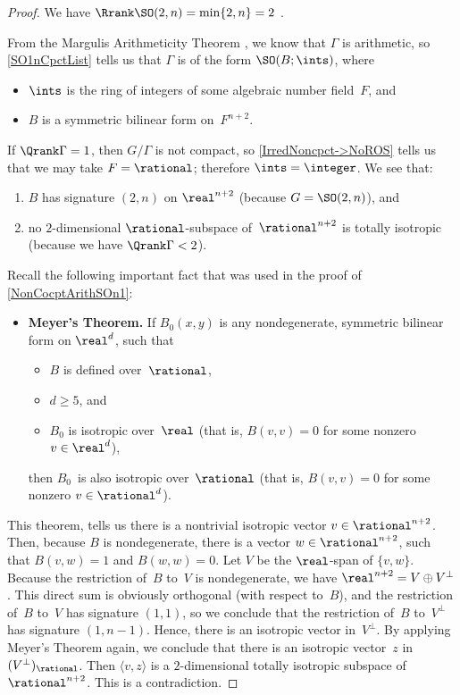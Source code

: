 \begin{proof}
 We have $\Rrank \SO(2,n) = \min\{2,n\} = 2$ .

From the Margulis Arithmeticity Theorem , we know that $\Gamma$ is
arithmetic, so \cref{SO1nCpctList} tells us that $\Gamma$ is of the form $\SO(B; \ints)$, where 
	\begin{itemize}
	\item $\ints$ is the ring of integers of some algebraic number field~$F$,
	and
	\item $B$ is a symmetric bilinear form on~$F^{n+2}$.
	\end{itemize}
If $\Qrank \Gamma = 1$, then $G/\Gamma$  is not compact, so \cref{IrredNoncpct->NoROS} tells us that we may take $F = \rational$; therefore $\ints = \integer$.
We see that:
	 \begin{enumerate}
	 \item $B$ has signature $(2,n)$ on $\real^{n+2}$ (because $G = \SO(2,n)$), 
	 and
	 \item no $2$-dimensional $\rational$-subspace of~$\rational^{n+2}$ is
	totally isotropic (because we have $\Qrank \Gamma < 2$).
	 \end{enumerate}
Recall the following important fact that was used in the proof of \cref{NonCocptArithSOn1}:
	 \begin{itemize} \renewcommand{\labelitemi}{}
	  \it
	 \item \label{Isot/R->Isot/Q}
	 {\bf Meyer's Theorem.}
	 If $B_0(x,y)$ is any nondegenerate, symmetric bilinear form
	on\/ $\real^d$, such that
	 \begin{itemize}
	 \item $B$ is defined over\/~$\rational$, 
	 \item $d \ge 5$, and
	 \item $B_0$ is isotropic over\/~$\real$ \textup(that is, $B(v,v) =
	0$ for some nonzero $v \in \real^d$\textup), 
	 \end{itemize}
	 then $B_0$~is also isotropic over\/~$\rational$ \textup(that is,
	$B(v,v) = 0$ for some nonzero $v \in \rational^d$\textup).
	 \end{itemize}
This theorem, %
tells us there is a
nontrivial isotropic vector $v \in \rational^{n+2}$. Then,
because $B$ is nondegenerate, there is a vector $w \in
\rational^{n+2}$, such that $B(v,w) = 1$ and $B(w,w) = 0$.
Let $V$ be the $\real$-span of $\{ v,w \}$. Because the restriction
of~$B$ to~$V$ is nondegenerate, we have $\real^{n+2} = V
\oplus V^\perp$. This direct sum is obviously orthogonal
(with respect to~$B$), and the restriction of~$B$ to~$V$ has
signature $(1,1)$, so we conclude that the restriction
of~$B$ to~$V^\perp$ has signature $(1,n-1)$. Hence, there is
an isotropic vector in~$V^\perp$.
By applying Meyer's Theorem again, we conclude that there is an
isotropic vector~$z$ in $(V^\perp)_{\rational}$. Then
$\langle v,z \rangle$ is a $2$-dimensional totally isotropic
subspace of~$\rational^{n+2}$. This is a contradiction.
 \end{proof}
 

